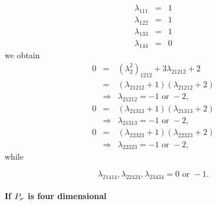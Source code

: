 \documentclass[12pt]{article}
\begin{document}
\begin{eqnarray*}
\lambda _{111} &=&1 \\
\lambda _{122} &=&1 \\
\lambda _{133} &=&1 \\
\lambda _{144} &=&0
\end{eqnarray*}%
we obtain 
\begin{eqnarray*}
0 &=&\left( \lambda _{2}^{2}\right) _{1212}+3\lambda _{21212}+2 \\
&=&\left( \lambda _{21212}+1\right) \left( \lambda _{21212}+2\right) \\
&\Rightarrow &\lambda _{21212}=-1\text{ or }-2,
\end{eqnarray*}%
\begin{eqnarray*}
0 &=&\left( \lambda _{21313}+1\right) \left( \lambda _{21313}+2\right) \\
&\Rightarrow &\lambda _{21313}=-1\text{ or }-2,
\end{eqnarray*}%
\begin{eqnarray*}
0 &=&\left( \lambda _{22323}+1\right) \left( \lambda _{22323}+2\right) \\
&\Rightarrow &\lambda _{22323}=-1\text{ or }-2,
\end{eqnarray*}%
while

\begin{equation*}
\lambda _{21414},\lambda _{22424},\lambda _{23434}=0\text{ or }-1.
\end{equation*}

\paragraph{If $P_{\mathcal{\protect\nu }}$ is four dimensional}
\end{document}
